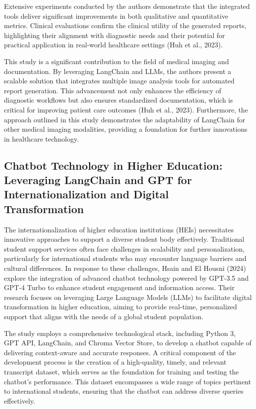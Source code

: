 Extensive experiments conducted by the authors demonstrate that the integrated tools deliver significant improvements in both qualitative and quantitative metrics. Clinical evaluations confirm the clinical utility of the generated reports, highlighting their alignment with diagnostic needs and their potential for practical application in real-world healthcare settings (Huh et al., 2023).

This study is a significant contribution to the field of medical imaging and documentation. By leveraging LangChain and LLMs, the authors present a scalable solution that integrates multiple image analysis tools for automated report generation. This advancement not only enhances the efficiency of diagnostic workflows but also ensures standardized documentation, which is critical for improving patient care outcomes (Huh et al., 2023). Furthermore, the approach outlined in this study demonstrates the adaptability of LangChain for other medical imaging modalities, providing a foundation for further innovations in healthcare technology.

\subsection{Chatbot Technology in Higher Education: Leveraging LangChain and GPT for Internationalization and Digital Transformation}

The internationalization of higher education institutions (HEIs) necessitates innovative approaches to support a diverse student body effectively. Traditional student support services often face challenges in scalability and personalization, particularly for international students who may encounter language barriers and cultural differences. In response to these challenges, Hsain and El Housni (2024) explore the integration of advanced chatbot technology powered by GPT-3.5 and GPT-4 Turbo to enhance student engagement and information access. Their research focuses on leveraging Large Language Models (LLMs) to facilitate digital transformation in higher education, aiming to provide real-time, personalized support that aligns with the needs of a global student population.

The study employs a comprehensive technological stack, including Python 3, GPT API, LangChain, and Chroma Vector Store, to develop a chatbot capable of delivering context-aware and accurate responses. A critical component of the development process is the creation of a high-quality, timely, and relevant transcript dataset, which serves as the foundation for training and testing the chatbot's performance. This dataset encompasses a wide range of topics pertinent to international students, ensuring that the chatbot can address diverse queries effectively.

